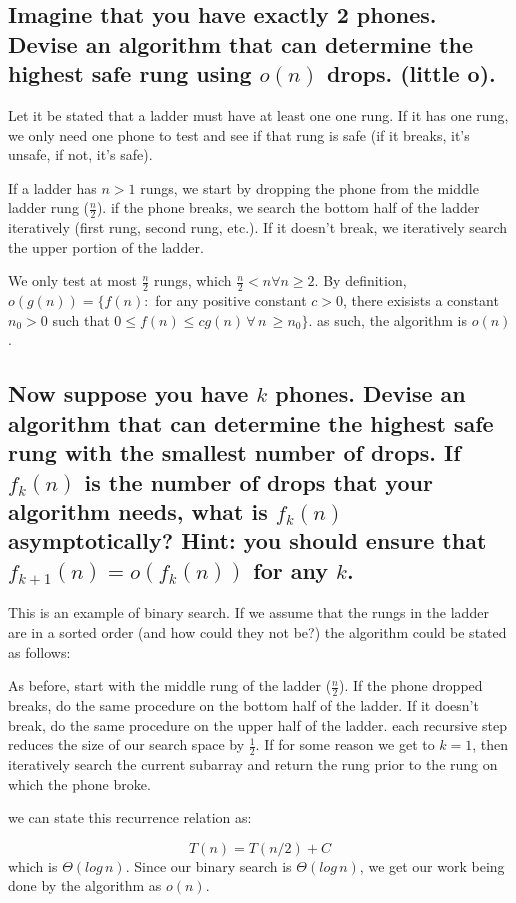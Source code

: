 \documentclass[titlepage]{article}\usepackage[]{graphicx}\usepackage[]{color}
\begin{document}
\subsection{ Imagine that you have exactly 2 phones. Devise an algorithm that
  can determine
the highest safe rung using $o(n)$ drops. (little o). }

  Let it be stated that a ladder must have at least one one rung. If it has
  one rung, we only need one phone to test and see if that rung is safe (if it
  breaks, it's unsafe, if not, it's safe).

  If a ladder has $n > 1$ rungs, we start by dropping the phone from the middle
  ladder rung ($\frac{n}{2}$). if the phone breaks, we search the bottom half of the
  ladder iteratively (first rung, second rung, etc.). If it doesn't break, we
  iteratively search the upper portion of the ladder. 

  We only test at most $\frac{n}{2}$ rungs, which $\frac{n}{2} < n
  \forall n \geq 2$. 
  By definition, $o(g(n)) = \{ f(n) : $ for any positive constant $c>0$, there
  exisists a constant $n_0 > 0$ such that $0 \leq f(n) \leq cg(n) \, \forall \,
  n \, \geq n_0\}$.
  as such, the algorithm is $o(n)$. 

\subsection{Now suppose you have $k$ phones. Devise an algorithm that can
  determine the highest safe rung with the smallest number of drops. If
  $f_k(n)$
  is the number of drops that your algorithm needs, what is 
  $f_k(n)$ asymptotically? Hint: you should ensure that 
  $f_{k+1}(n) = o(f_k(n))$ for any $k$.}

  This is an example of binary search. If we assume that the rungs in the
  ladder are in a sorted order (and how could they not be?) the algorithm could
  be stated as follows:

  As before, start with the middle rung of the ladder ($\frac{n}{2}$). If the
  phone dropped breaks, do the same procedure on the bottom half of the ladder.
  If it doesn't break, do the same procedure on the upper half of the ladder.
  each recursive step reduces the size of our search space by $\frac{1}{2}$. If
  for some reason we get to $k=1$, then iteratively search the current subarray
  and return the rung prior to the rung on which the phone broke.

  we can state this recurrence relation as:

  \[ T(n) = T(n/2) + C \]
  which is $\Theta(log\,n)$. Since our binary search is $\Theta(log\,n)$, we
  get our work being done by the algorithm as $o(n)$. 
  
\end{document}

